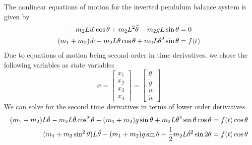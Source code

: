 \documentclass[12pt]{article}
\numberwithin{equation}{section}
\begin{document}
The nonlinear equations of motion for the inverted pendulum balance system is given by
\begin{align}
    -m_2 L \Ddot{w} \cos\theta + m_2 L^2 \Ddot{\theta} - m_2 g L \sin\theta &= 0\\
    (m_1 + m_2) \Ddot{w} - m_2 L \Ddot{\theta} \cos\theta + m_2 L \dot{\theta}^2 \sin\theta &= f(t)
\end{align}
Due to equations of motion being second order in time derivatives, we chose the following variables as state variables
\begin{equation}
    x = 
    \begin{bmatrix}
        x_1\\
        x_2\\
        x_3\\
        x_4
    \end{bmatrix}
    =
    \begin{bmatrix}
        \theta\\
        \dot{\theta}\\
        w\\
        \dot{w}
    \end{bmatrix}
\end{equation}
We can solve for the second time derivatives in terms of lower order derivatives
\begin{align}
    (m_1 + m_2) L \Ddot{\theta} - m_2 L \Ddot{\theta} \cos^2\theta - (m_1 + m_2) g \sin\theta + m_2 L \dot{\theta}^2 \sin\theta \cos\theta &= f(t) \cos\theta\\
    (m_1 + m_2 \sin^2\theta) L \Ddot{\theta} - (m_1 + m_2) g \sin\theta + \frac{1}{2} m_2 L \dot{\theta}^2 \sin2\theta &= f(t) \cos\theta
\end{align}
\end{document}
